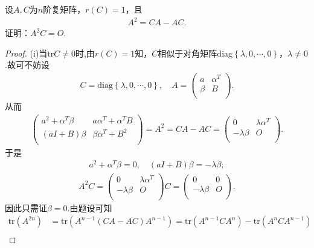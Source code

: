 \documentclass[../../main.tex]{subfiles}%
\begin{document}
\begin{example}
设$A,C$为$n$阶复矩阵，$r\left( C \right) =1$，且
\begin{align*}
A^2=CA-AC.
\end{align*}
证明：$A^2C=O$.
\end{example}
\begin{proof}

(i)当$\mathrm{tr}C\neq 0$时,由$r\left( C \right) =1$知，$C$相似于对角矩阵$\mathrm{diag}\left\{ \lambda ,0,\cdots ,0 \right\}$，$\lambda \ne 0$.故可不妨设
\begin{align*}
C=\mathrm{diag}\left\{ \lambda ,0,\cdots ,0 \right\},\quad A=\left( \begin{matrix}
a&		\alpha ^T\\
\beta&		B\\
\end{matrix} \right).
\end{align*}
从而
\begin{align*}
\left( \begin{matrix}
a^2+\alpha ^T\beta&		a\alpha ^T+\alpha ^TB\\
\left( aI+B \right) \beta&		\beta \alpha ^T+B^2\\
\end{matrix} \right) =A^2=CA-AC=\left( \begin{matrix}
0&		\lambda \alpha ^T\\
-\lambda \beta&		O\\
\end{matrix} \right).
\end{align*}
于是
\begin{align}\label{eq:::--3r90jw8fgjes0g9-j34gjdrsjg90ejrs9bjes1}
a^2+\alpha ^T\beta =0,\quad \left( aI+B \right) \beta =-\lambda \beta;
\end{align}
\begin{align*}
A^2C=\left( \begin{matrix}
0&		\lambda \alpha ^T\\
-\lambda \beta&		O\\
\end{matrix} \right) C=\left( \begin{matrix}
0&		0\\
-\lambda \beta&		O\\
\end{matrix} \right).
\end{align*}
因此只需证$\beta =0$.由题设可知
\begin{align*}
\mathrm{tr}\left( A^{2n} \right) &=\mathrm{tr}\left( A^{n-1}\left( CA-AC \right) A^{n-1} \right) =\mathrm{tr}\left( A^{n-1}CA^n \right) -\mathrm{tr}\left( A^nCA^{n-1} \right) \\

\end{align*}
\end{proof}
\end{document}
